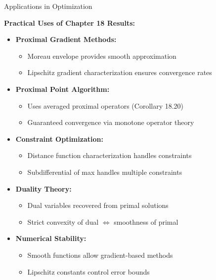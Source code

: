 \documentclass[aspectratio=169,10pt]{beamer}
\theoremstyle{definition}
\begin{document}
\begin{frame}{Applications in Optimization}

\textbf{Practical Uses of Chapter 18 Results:}

\vspace{0.2cm}

\begin{itemize}
  \item \textbf{Proximal Gradient Methods:}
    \begin{itemize}
      \item Moreau envelope provides smooth approximation
      \item Lipschitz gradient characterization ensures convergence rates
    \end{itemize}

  \item \textbf{Proximal Point Algorithm:}
    \begin{itemize}
      \item Uses averaged proximal operators (Corollary 18.20)
      \item Guaranteed convergence via monotone operator theory
    \end{itemize}

  \item \textbf{Constraint Optimization:}
    \begin{itemize}
      \item Distance function characterization handles constraints
      \item Subdifferential of max handles multiple constraints
    \end{itemize}

  \item \textbf{Duality Theory:}
    \begin{itemize}
      \item Dual variables recovered from primal solutions
      \item Strict convexity of dual $\Leftrightarrow$ smoothness of primal
    \end{itemize}

  \item \textbf{Numerical Stability:}
    \begin{itemize}
      \item Smooth functions allow gradient-based methods
      \item Lipschitz constants control error bounds
    \end{itemize}
\end{itemize}

\end{frame}
\end{document}

